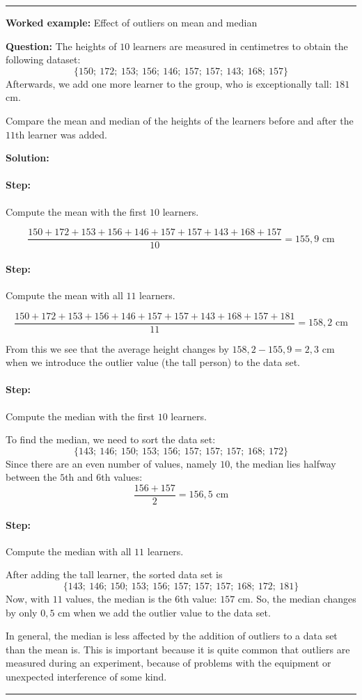 \documentclass[a4paper,11pt]{report}
\newenvironment{wex}[3]%
{\rule{\linewidth}{0.5mm}
\textbf{Worked example:} #1

\textbf{Question:} #2

\textbf{Solution:} #3}%
{\rule{\linewidth}{0.5mm}}
\newcommand{\westep}[1]{\paragraph{Step:} #1}
\begin{document}
\begin{wex}{Effect of outliers on mean and median}{
    The heights of $10$ learners are measured in centimetres to obtain
    the following dataset:
    \begin{equation}
      \{150;\ 172;\ 153;\ 156;\ 146;\ 157;\ 157;\ 143;\ 168;\ 157\}
    \end{equation}
    Afterwards, we add one more learner to the group, who is
    exceptionally tall: $181$ cm.

    Compare the mean and median of the heights of the learners before
    and after the $11$th learner was added.
}{
  \westep{Compute the mean with the first $10$ learners.}

  \begin{equation}
    \frac{150 + 172 + 153 + 156 + 146 + 157 + 157 + 143 + 168 + 157}{10}
    = 155,9\textrm{ cm}
  \end{equation}

  \westep{Compute the mean with all $11$ learners.}

  \begin{equation}
    \frac{150 + 172 + 153 + 156 + 146 + 157 + 157 + 143 + 168 + 157 + 181}{11}
    = 158,2\textrm{ cm}
  \end{equation}

  From this we see that the average height changes by
  $158,2 - 155,9 = 2,3\textrm{ cm}$ when we introduce
  the outlier value (the tall person) to the data set.

  \westep{Compute the median with the first $10$ learners.}

  To find the median, we need to sort the data set:
  \begin{equation}
    \{143;\ 146;\ 150;\ 153;\ 156;\ 157;\ 157;\ 157;\ 168;\ 172\}
  \end{equation}
  Since there are an even number of values, namely $10$, the median
  lies halfway between the $5$th and $6$th values:
  \begin{equation}
    \frac{156+157}{2} = 156,5\textrm{ cm}
  \end{equation}

  \westep{Compute the median with all $11$ learners.}

  After adding the tall learner, the sorted data set is
  \begin{equation}
    \{143;\ 146;\ 150;\ 153;\ 156;\ 157;\ 157;\ 157;\ 168;\ 172;\ 181\}
  \end{equation}
  Now, with $11$ values, the median is the $6$th value: $157$ cm.
  So, the median changes by only $0,5$ cm when we add the outlier
  value to the data set.

  In general, the median is less affected by the addition of outliers
  to a data set than the mean is. This is important because it is
  quite common that outliers are measured during an experiment,
  because of problems with the equipment or unexpected interference of
  some kind.
}
\end{wex}
\end{document}

